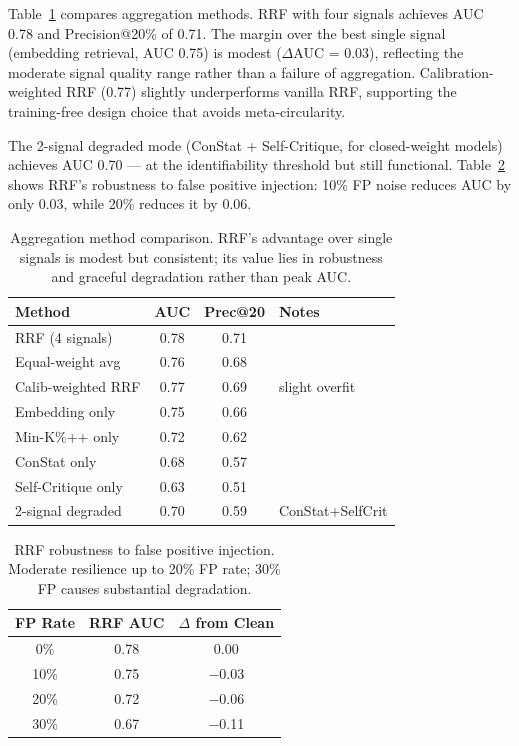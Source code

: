 \documentclass[letterpaper,11pt]{article}
\begin{document}
Table~\ref{tab:rrf} compares aggregation methods. RRF with four signals achieves AUC 0.78 and Precision@20\% of 0.71. The margin over the best single signal (embedding retrieval, AUC 0.75) is modest ($\Delta$AUC = 0.03), reflecting the moderate signal quality range rather than a failure of aggregation. Calibration-weighted RRF (0.77) slightly underperforms vanilla RRF, supporting the training-free design choice that avoids meta-circularity.

The 2-signal degraded mode (ConStat + Self-Critique, for closed-weight models) achieves AUC 0.70 --- at the identifiability threshold but still functional. Table~\ref{tab:fp_robust} shows RRF's robustness to false positive injection: 10\% FP noise reduces AUC by only 0.03, while 20\% reduces it by 0.06.

\begin{table}[t]
\centering
\caption{Aggregation method comparison. RRF's advantage over single signals is modest but consistent; its value lies in robustness and graceful degradation rather than peak AUC.}
\label{tab:rrf}
\small
\begin{tabular}{lccl}
\toprule
Method & AUC & Prec@20 & Notes \\
\midrule
RRF (4 signals) & 0.78 & 0.71 & \\
Equal-weight avg & 0.76 & 0.68 & \\
Calib-weighted RRF & 0.77 & 0.69 & slight overfit \\
Embedding only & 0.75 & 0.66 & \\
Min-K\%++ only & 0.72 & 0.62 & \\
ConStat only & 0.68 & 0.57 & \\
Self-Critique only & 0.63 & 0.51 & \\
2-signal degraded & 0.70 & 0.59 & ConStat+SelfCrit \\
\bottomrule
\end{tabular}
\end{table}

\begin{table}[t]
\centering
\caption{RRF robustness to false positive injection. Moderate resilience up to 20\% FP rate; 30\% FP causes substantial degradation.}
\label{tab:fp_robust}
\small
\begin{tabular}{ccc}
\toprule
FP Rate & RRF AUC & $\Delta$ from Clean \\
\midrule
0\% & 0.78 & 0.00 \\
10\% & 0.75 & $-$0.03 \\
20\% & 0.72 & $-$0.06 \\
30\% & 0.67 & $-$0.11 \\
\bottomrule
\end{tabular}
\end{table}
\end{document}
